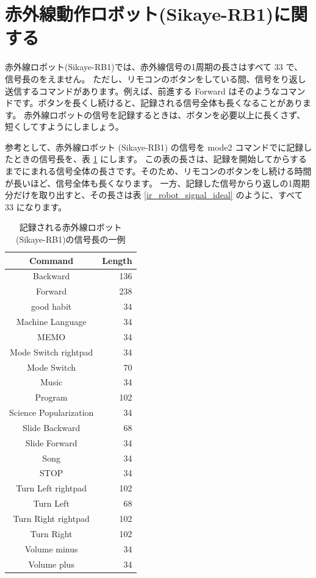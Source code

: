 \documentclass[text05.tex]{subfiles}
\begin{document}
\section{赤外線動作ロボット(Sikaye-RB1)に関する} \label{ir_robot_notice}
赤外線ロボット(Sikaye-RB1)では、赤外線信号の1周期の長さはすべて 33 で、
信号長のをえません。
ただし、リモコンのボタンをしている間、信号をり返し送信するコマンドがあります。例えば、前進する Forward はそのようなコマンドです。ボタンを長くし続けると、記録される信号全体も長くなることがあります。
赤外線ロボットの信号を記録するときは、ボタンを必要以上に長くさず、短くしてすようにしましょう。

参考として、赤外線ロボット (Sikaye-RB1) の信号を mode2 コマンドでに記録したときの信号長を、表 \ref{ir_robot_signal} にします。
この表の長さは、記録を開始してからするまでにまれる信号全体の長さです。そのため、リモコンのボタンをし続ける時間が長いほど、信号全体も長くなります。
一方、記録した信号からり返しの1周期分だけを取り出すと、その長さは表 \ref{ir_robot_signal_ideal} のように、すべて 33 になります。

\begin{table}[htbp] \begin{center}
    \caption{記録される赤外線ロボット(Sikaye-RB1)の信号長の一例}
    \label{ir_robot_signal}
    \begin{tabular}{cr}
\hline
Command & Length \\
\hline
Backward & 136 \\
Forward & 238 \\
good habit & 34 \\
Machine Language & 34 \\
MEMO & 34 \\
Mode Switch rightpad & 34 \\
Mode Switch & 70 \\
Music & 34 \\
Program & 102 \\
Science Popularization & 34 \\
Slide Backward & 68 \\
Slide Forward & 34 \\
Song & 34 \\
STOP & 34 \\
Turn Left rightpad & 102 \\
Turn Left & 68 \\
Turn Right rightpad & 102 \\
Turn Right & 102 \\
Volume minus & 34 \\
Volume plus & 34 \\
\hline
    \end{tabular}
\end{center} \end{table}
\end{document}
